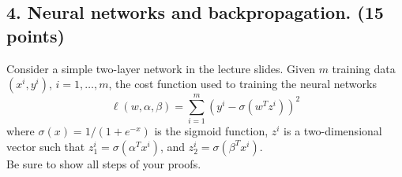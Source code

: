\documentclass[twoside,10pt]{article}
\begin{document}
\begin{enumerate}
\end{enumerate}


\subsection*{4. Neural networks and backpropagation. (15 points)}


Consider a simple two-layer network in the lecture slides. Given $m$ training data $(x^i, y^i)$, $i = 1, \ldots, m$, the cost function used to training the neural networks
\[
\ell(w, \alpha, \beta) = \sum_{i=1}^m (y^i - \sigma(w^T z^i))^2
\]
where $\sigma (x) = 1/(1+e^{-x})$ is the sigmoid function, $z^i$ is a two-dimensional vector such that  $z_1^i = \sigma(\alpha^T x^i)$, and $z_2^i = \sigma(\beta^T x^i)$.
\\
Be sure to show all steps of your proofs.
\end{document}
